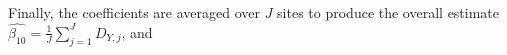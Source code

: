 Finally, the coefficients are averaged over $J$ sites to produce the overall estimate $\hat{\beta_{10}}=\frac{1}{J} \sum_{j=1}^J D_{Y,j}$, and